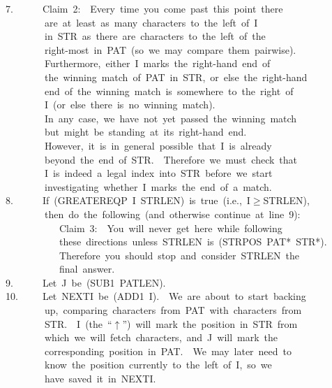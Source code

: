\documentclass[11pt]{book}
\newenvironment{pubasis}{\begin{flushleft}\ttfamily\small}{\normalsize\rmfamily\end{flushleft}}
\begin{document}
\begin{pubasis}
7.~~~~~~Claim~2:~~Every~time~you~come~past~this~point~there\\
~~~~~~~~are~at~least~as~many~characters~to~the~left~of~I\\
~~~~~~~~in~STR~as~there~are~characters~to~the~left~of~the\\
~~~~~~~~right-most~in~PAT~(so~we~may~compare~them~pairwise).\\
~~~~~~~~Furthermore,~either~I~marks~the~right-hand~end~of\\
~~~~~~~~the~winning~match~of~PAT~in~STR,~or~else~the~right-hand\\
~~~~~~~~end~of~the~winning~match~is~somewhere~to~the~right~of\\
~~~~~~~~I~(or~else~there~is~no~winning~match).\\
~~~~~~~~In~any~case,~we~have~not~yet~passed~the~winning~match\\
~~~~~~~~but~might~be~standing~at~its~right-hand~end.\\

~~~~~~~~However,~it~is~in~general~possible~that~I~is~already\\
~~~~~~~~beyond~the~end~of~STR.~~Therefore~we~must~check~that\\
~~~~~~~~I~is~indeed~a~legal~index~into~STR~before~we~start\\
~~~~~~~~investigating~whether~I~marks~the~end~of~a~match.\\

8.~~~~~~If~(GREATEREQP~I~STRLEN)~is~true~(i.e.,~I$\geq$STRLEN),\\
~~~~~~~~then~do~the~following~(and~otherwise~continue~at~line~9):\\

~~~~~~~~~~~Claim~3:~~You~will~never~get~here~while~following\\
~~~~~~~~~~~these~directions~unless~STRLEN~is~(STRPOS~PAT*~STR*).\\

~~~~~~~~~~~Therefore~you~should~stop~and~consider~STRLEN~the\\
~~~~~~~~~~~final~answer.\\

9.~~~~~~Let~J~be~(SUB1~PATLEN).\\

10.~~~~~Let~NEXTI~be~(ADD1~I).~~We~are~about~to~start~backing\\
~~~~~~~~up,~comparing~characters~from~PAT~with~characters~from\\
~~~~~~~~STR.~~I~(the~``$\uparrow$'')~will~mark~the~position~in~STR~from\\
~~~~~~~~which~we~will~fetch~characters,~and~J~will~mark~the\\
~~~~~~~~corresponding~position~in~PAT.~~We~may~later~need~to~\\
~~~~~~~~know~the~position~currently~to~the~left~of~I,~so~we\\
~~~~~~~~have~saved~it~in~NEXTI.\\


\end{pubasis}
\end{document}
